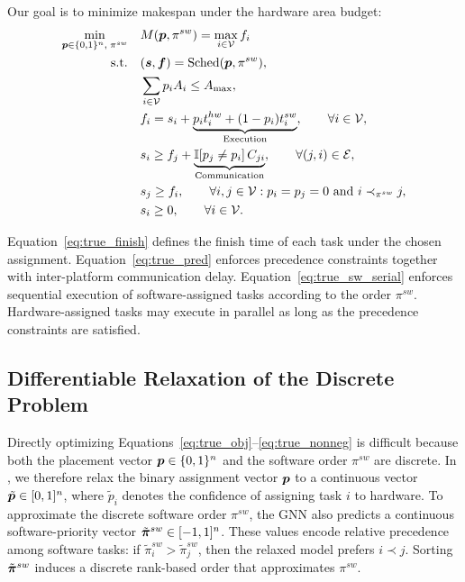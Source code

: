 Our goal is to minimize makespan under the hardware area budget:
\begin{align}
\min_{{\bm{p}} \in \{0,1\}^n,\;\pi^{sw}} \quad
& M({\bm{p}},\pi^{sw}) = \max_{i\in{\mathcal{V}}} f_i
\label{eq:true_obj}\\
\text{s.t.}\quad
& ({\bm{s}},{\bm{f}})=\mathrm{Sched}({\bm{p}},\pi^{sw}),
\label{eq:true_sched}\\
& \sum_{i\in{\mathcal{V}}} p_i A_i \le A_{\max},
\label{eq:true_area}\\
& f_i = s_i + \underbrace{p_i t_i^{hw} + (1-p_i)t_i^{sw}}_{\mathrm{Execution}},
\qquad \forall i\in{\mathcal{V}},
\label{eq:true_finish}\\
& s_i \ge f_j + \underbrace{\mathbb{I}[p_j \neq p_i]\, C_{ji}}_{\mathrm{Communication}},
\qquad \forall (j,i)\in{\mathcal{E}},
\label{eq:true_pred}\\
& s_j \ge f_i,
\qquad \forall i,j\in{\mathcal{V}}: p_i=p_j=0
\text{ and } i \prec_{\pi^{sw}} j,
\label{eq:true_sw_serial}\\
& s_i \ge 0,
\qquad \forall i\in{\mathcal{V}}.
\label{eq:true_nonneg}
\end{align}

Equation~\eqref{eq:true_finish} defines the finish time of each task under the chosen assignment. Equation~\eqref{eq:true_pred} enforces precedence constraints together with inter-platform communication delay. Equation~\eqref{eq:true_sw_serial} enforces sequential execution of software-assigned tasks according to the order $\pi^{sw}$. Hardware-assigned tasks may execute in parallel as long as the precedence constraints are satisfied.


\subsection{Differentiable Relaxation of the Discrete Problem}

Directly optimizing Equations~\eqref{eq:true_obj}--\eqref{eq:true_nonneg} is difficult because both the placement vector ${\bm{p}} \in \{0,1\}^n$ and the software order $\pi^{sw}$ are discrete. In \diffgnn, we therefore relax the binary assignment vector ${\bm{p}}$ to a continuous vector $\tilde{{\bm{p}}}\in[0,1]^n$, where $\tilde{p}_i$ denotes the confidence of assigning task $i$ to hardware. To approximate the discrete software order $\pi^{sw}$, the GNN also predicts a continuous software-priority vector $\tilde{\bm{\pi}}^{sw}\in[-1,1]^n$. These values encode relative precedence among software tasks: if $\tilde{\pi}_i^{sw} > \tilde{\pi}_j^{sw}$, then the relaxed model prefers $i \prec j$. Sorting $\tilde{\bm{\pi}}^{sw}$ induces a discrete rank-based order that approximates $\pi^{sw}$.

